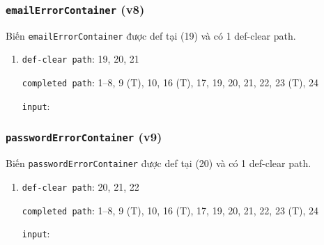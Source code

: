 \documentclass{article}
\begin{document}
\subsubsection*{\texttt{emailErrorContainer} (v8)}

\par Biến \texttt{emailErrorContainer} được def tại (19) và có 1 def-clear path.

\begin{enumerate}
    \item \texttt{def-clear path}: 19, 20, 21
          \par \texttt{completed path}: 1--8, 9 (T), 10, 16 (T), 17, 19, 20, 21, 22, 23 (T), 24
          \par \texttt{input}:
\end{enumerate}

\subsubsection*{\texttt{passwordErrorContainer} (v9)}

\par Biến \texttt{passwordErrorContainer} được def tại (20) và có 1 def-clear path.

\begin{enumerate}
    \item \texttt{def-clear path}: 20, 21, 22
          \par \texttt{completed path}: 1--8, 9 (T), 10, 16 (T), 17, 19, 20, 21, 22, 23 (T), 24
          \par \texttt{input}:
\end{enumerate}
\end{document}
